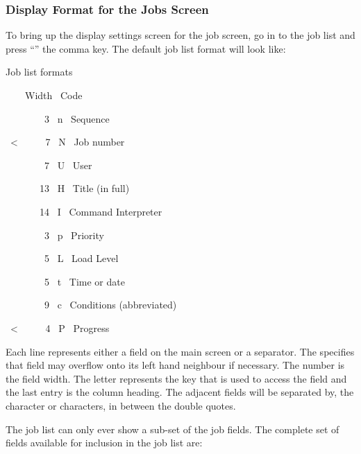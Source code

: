 \subsubsection{Display Format for the Jobs Screen}
To bring up the display settings screen for the job screen, go in to the job list and press
``\userentry{,}'' the comma key. The default job list format will look like:

\begin{exparasmall}

Job list formats

\ \ \ \ Width \ Code

\ \ \ \ \ \ \ \ 3 \ n \ Sequence

{\textquotedbl} {\textquotedbl}

\ {\textless} \ \ \ \ \ 7 \ N \ Job number

{\textquotedbl} {\textquotedbl}

\ \ \ \ \ \ \ \ 7 \ U \ User

{\textquotedbl} {\textquotedbl}

\ \ \ \ \ \ \ 13 \ H \ Title (in full)

{\textquotedbl} {\textquotedbl}

\ \ \ \ \ \ \ 14 \ I \ Command Interpreter

{\textquotedbl} {\textquotedbl}

\ \ \ \ \ \ \ \ 3 \ p \ Priority

\ \ \ \ \ \ \ \ 5 \ L \ Load Level

{\textquotedbl} {\textquotedbl}

\ \ \ \ \ \ \ \ 5 \ t \ Time or date

{\textquotedbl} {\textquotedbl}

\ \ \ \ \ \ \ \ 9 \ c \ Conditions (abbreviated)

{\textquotedbl} {\textquotedbl}

\ {\textless} \ \ \ \ \ 4 \ P \ Progress

\end{exparasmall}

Each line represents either a field on the main screen or a separator.
The \exampletext{{\textless}} specifies that field may
overflow onto its left hand neighbour if necessary. The number is the
field width. The letter represents the key that is used to access the
field and the last entry is the column heading. The adjacent fields
will be separated by, the character or characters, in between the
double quotes.

The job list can only ever show a sub-set of the job fields. The
complete set of fields available for inclusion in the job list are:

